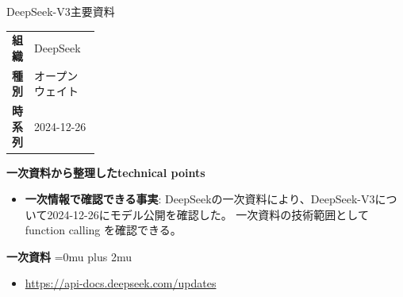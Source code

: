 \begin{technicalnote}{DeepSeek-V3}{主要資料}
\begingroup
\begin{tabularx}{\linewidth}{@{}>{\bfseries}p{0.22\linewidth}X@{}}
組織 & DeepSeek \\
種別 & オープンウェイト \\
時系列 & 2024-12-26 \\
\end{tabularx}
\smallskip
{\bfseries 一次資料から整理したtechnical points}
\begin{itemize}[leftmargin=1.5em,itemsep=0.35em]
\item \textbf{一次情報で確認できる事実}: DeepSeekの一次資料により、DeepSeek-V3について2024-12-26にモデル公開を確認した。 一次資料の技術範囲として function calling を確認できる。
\end{itemize}
\begin{minipage}{\linewidth}
\begin{samepage}
{\bfseries 一次資料}
\begingroup\sloppy
\Urlmuskip=0mu plus 2mu\relax
\begin{itemize}[leftmargin=1.5em,itemsep=0.25em]
\item {\scriptsize\url{https://api-docs.deepseek.com/updates}}
\end{itemize}
\endgroup
\end{samepage}
\end{minipage}
\endgroup
\end{technicalnote}
\medskip


